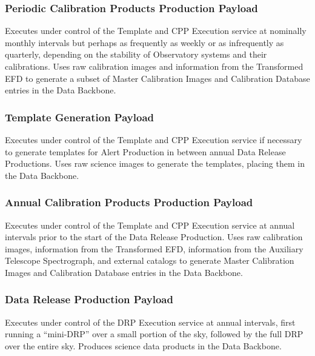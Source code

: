 \documentclass[DM,toc]{lsstdoc}
\begin{document}
\subsubsection{Periodic Calibration Products Production
Payload}\label{periodic-calibration-products-production-payload}

Executes under control of the Template and CPP Execution service at
nominally monthly intervals but perhaps as frequently as weekly or as
infrequently as quarterly, depending on the stability of Observatory
systems and their calibrations. Uses raw calibration images and
information from the Transformed EFD to generate a subset of Master
Calibration Images and Calibration Database entries in the Data
Backbone.

\subsubsection{Template Generation
Payload}\label{template-generation-payload}

Executes under control of the Template and CPP Execution service if
necessary to generate templates for Alert Production in between annual
Data Release Productions. Uses raw science images to generate the
templates, placing them in the Data Backbone.

\subsubsection{Annual Calibration Products Production
Payload}\label{annual-calibration-products-production-payload}

Executes under control of the Template and CPP Execution service at
annual intervals prior to the start of the Data Release Production. Uses
raw calibration images, information from the Transformed EFD,
information from the Auxiliary Telescope Spectrograph, and external
catalogs to generate Master Calibration Images and Calibration Database
entries in the Data Backbone.

\subsubsection{Data Release Production
Payload}\label{data-release-production-payload}

Executes under control of the DRP Execution service at annual intervals,
first running a ``mini-DRP'' over a small portion of the sky, followed
by the full DRP over the entire sky. Produces science data products in
the Data Backbone.
\end{document}
